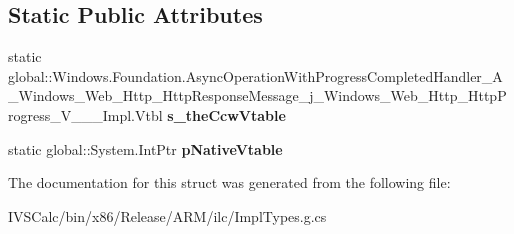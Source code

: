 \subsection*{Static Public Attributes}
\begin{DoxyCompactItemize}
\item 
\mbox{\label{struct_windows_1_1_foundation_1_1_async_operation_with_progress_completed_handler___a___windows_aed865ee38f1f3fe63b6da8d83d4b4f2_aab560b8fe93ea239b2c6c713d9babdf4}} 
static global\+::\+Windows.\+Foundation.\+Async\+Operation\+With\+Progress\+Completed\+Handler\+\_\+\+A\+\_\+\+Windows\+\_\+\+Web\+\_\+\+Http\+\_\+\+Http\+Response\+Message\+\_\+j\+\_\+\+Windows\+\_\+\+Web\+\_\+\+Http\+\_\+\+Http\+Progress\+\_\+\+V\+\_\+\+\_\+\+\_\+\+Impl.\+Vtbl {\bfseries s\+\_\+the\+Ccw\+Vtable}
\item 
\mbox{\label{struct_windows_1_1_foundation_1_1_async_operation_with_progress_completed_handler___a___windows_aed865ee38f1f3fe63b6da8d83d4b4f2_a12b112c4a0f57369f54c929fc0df2696}} 
static global\+::\+System.\+Int\+Ptr {\bfseries p\+Native\+Vtable}
\end{DoxyCompactItemize}


The documentation for this struct was generated from the following file\+:\begin{DoxyCompactItemize}
\item 
I\+V\+S\+Calc/bin/x86/\+Release/\+A\+R\+M/ilc/Impl\+Types.\+g.\+cs\end{DoxyCompactItemize}
